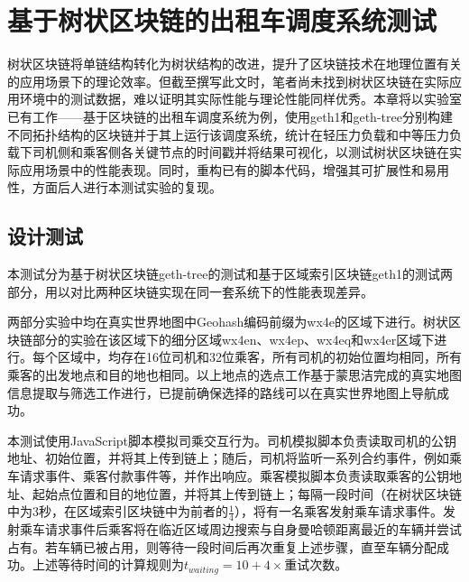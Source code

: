 %
%
%
%
%

\chapter{基于树状区块链的出租车调度系统测试}

树状区块链将单链结构转化为树状结构的改进，提升了区块链技术在地理位置有关的应用场景下的理论效率。但截至撰写此文时，笔者尚未找到树状区块链在实际应用环境中的测试数据，难以证明其实际性能与理论性能同样优秀。本章将以实验室已有工作——基于区块链的出租车调度系统为例，使用geth1和geth-tree分别构建不同拓扑结构的区块链并于其上运行该调度系统，统计在轻压力负载和中等压力负载下司机侧和乘客侧各关键节点的时间戳并将结果可视化，以测试树状区块链在实际应用场景中的性能表现。同时，重构已有的脚本代码，增强其可扩展性和易用性，方面后人进行本测试实验的复现。

\section{设计测试}

本测试分为基于树状区块链geth-tree的测试和基于区域索引区块链geth1的测试两部分，用以对比两种区块链实现在同一套系统下的性能表现差异。

两部分实验中均在真实世界地图中Geohash编码前缀为wx4e的区域下进行。树状区块链部分的实验在该区域下的细分区域wx4en、wx4ep、wx4eq和wx4er区域下进行。每个区域中，均存在16位司机和32位乘客，所有司机的初始位置均相同，所有乘客的出发地点和目的地也相同。以上地点的选点工作基于蒙思洁完成的真实地图信息提取与筛选工作进行，已提前确保选择的路线可以在真实世界地图上导航成功。

本测试使用JavaScript脚本模拟司乘交互行为。司机模拟脚本负责读取司机的公钥地址、初始位置，并将其上传到链上；随后，司机将监听一系列合约事件，例如乘车请求事件、乘客付款事件等，并作出响应。乘客模拟脚本负责读取乘客的公钥地址、起始点位置和目的地位置，并将其上传到链上；每隔一段时间（在树状区块链中为3秒，在区域索引区块链中为前者的$\frac14$），将有一名乘客发射乘车请求事件。发射乘车请求事件后乘客将在临近区域周边搜索与自身曼哈顿距离最近的车辆并尝试占有。若车辆已被占用，则等待一段时间后再次重复上述步骤，直至车辆分配成功。上述等待时间的计算规则为$t_{waiting} = 10 + 4 \times $重试次数。


